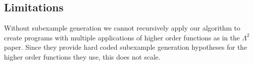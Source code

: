 \subsection{Limitations}

Without subexample generation we cannot recursively apply our algorithm to create programs with multiple applications of higher order functions as in the   $\Lambda^2$ paper\cite{isil}. Since they provide hard coded subexample generation hypotheses for the higher order functions they use, this does not scale.